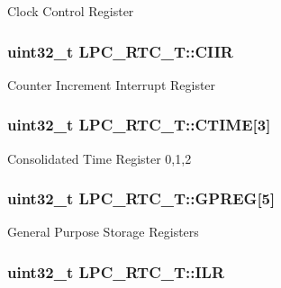Clock Control Register \hypertarget{structLPC__RTC__T_ac9d2627afcf203dccde2675c6c74d673}{
\subsubsection[{C\-I\-I\-R}]{ uint32\-\_\-t L\-P\-C\-\_\-\-R\-T\-C\-\_\-\-T\-::\-C\-I\-I\-R}}\label{structLPC__RTC__T_ac9d2627afcf203dccde2675c6c74d673}
Counter Increment Interrupt Register \hypertarget{structLPC__RTC__T_a66b166ccd4abefe149e6e3ef6d833554}{
\subsubsection[{C\-T\-I\-M\-E}]{ uint32\-\_\-t L\-P\-C\-\_\-\-R\-T\-C\-\_\-\-T\-::\-C\-T\-I\-M\-E\mbox{[}3\mbox{]}}}\label{structLPC__RTC__T_a66b166ccd4abefe149e6e3ef6d833554}
Consolidated Time Register 0,1,2 \hypertarget{structLPC__RTC__T_a6624a04c6db73e0f9e53a9bc3cf50c1a}{
\subsubsection[{G\-P\-R\-E\-G}]{ uint32\-\_\-t L\-P\-C\-\_\-\-R\-T\-C\-\_\-\-T\-::\-G\-P\-R\-E\-G\mbox{[}5\mbox{]}}}\label{structLPC__RTC__T_a6624a04c6db73e0f9e53a9bc3cf50c1a}
General Purpose Storage Registers \hypertarget{structLPC__RTC__T_a6e1debaa7074a0fae4767a70f9abff29}{
\subsubsection[{I\-L\-R}]{ uint32\-\_\-t L\-P\-C\-\_\-\-R\-T\-C\-\_\-\-T\-::\-I\-L\-R}}\label{structLPC__RTC__T_a6e1debaa7074a0fae4767a70f9abff29}
